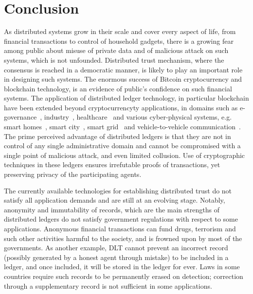 \section{Conclusion}

As distributed systems grow in their scale and cover every aspect of life, from financial transactions to control of household
gadgets, there is a growing fear among public about misuse of private data and of malicious attack on such systems, which is 
not unfounded. Distributed trust mechanism, where the consensus is reached in a democratic manner, is likely to play an important 
role in designing such systems. The enormous success of Bitcoin cryptocurrency and blockchain technology, is an evidence of public's 
confidence on such financial systems. The application of distributed ledger technology, in particular blockchain have been extended 
beyond cryptocurrencyty applications, in domains such as e-governance~\citep{Batubara:2018}, industry~\citep{Bodkhe:2020}, 
healthcare~\citep{Mettler:2016} and various cyber-physical systems, e.g. smart homes~\citep{Dorri:2017}, smart city~\citep{Panarello:2018}, 
smart grid~\cite{Li:2018}  and vehicle-to-vehicle communication~\citep{Elagin:2020}.
%
The prime perceived advantage of distributed ledgers is that they are not in control of any single administrative domain and cannot 
be compromised with a single point of malicious attack, and even limited collusion. Use of cryptographic techniques in these ledgers 
ensures irrefutable proofs of transactions, yet preserving privacy of the participating agents. 

The currently available technologies for establishing distributed trust do not satisfy all application demands and are still at
an evolving stage. Notably, anonymity and immutability of records, which are the main strengths of distributed ledgers do not 
satisfy government regulations with respect to some applications. Anonymous financial transactions can fund drugs, terrorism 
and such other activities harmful to the society, and is frowned upon by most of the governments. As another example, DLT cannot 
prevent an incorrect record (possibly generated by a honest agent through mistake) to be included in a ledger, and once included,
it will be stored in the ledger for ever. Laws in some countries require such records to be permanently erased on detection; 
correction through a supplementary record is not sufficient in some applications.


